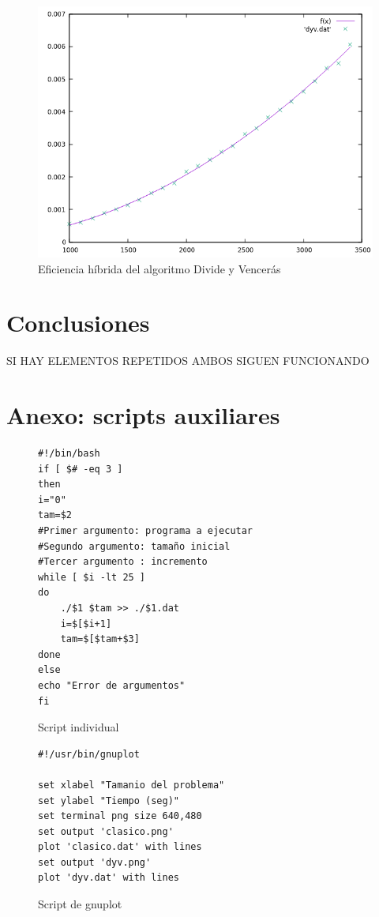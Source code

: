 \documentclass[12pt,spanish]{article}
\begin{document}
\begin{figure}[H]
\centering
\includegraphics[scale=0.75]{hibrida_dyv.png}
\caption{Eficiencia híbrida del algoritmo Divide y Vencerás}
\end{figure}

\newpage

\section{Conclusiones}

SI HAY ELEMENTOS REPETIDOS AMBOS SIGUEN FUNCIONANDO
\section{Anexo: scripts auxiliares}
\label{sec:scripts}

\begin{figure}[H]
\begin{verbatim}
#!/bin/bash
if [ $# -eq 3 ]
then
i="0"
tam=$2
#Primer argumento: programa a ejecutar
#Segundo argumento: tamaño inicial
#Tercer argumento : incremento
while [ $i -lt 25 ]
do
	./$1 $tam >> ./$1.dat
	i=$[$i+1]
	tam=$[$tam+$3]
done
else
echo "Error de argumentos"
fi

\end{verbatim}
\caption{Script individual}
\end{figure}



\begin{figure}[H]
\begin{verbatim}
#!/usr/bin/gnuplot

set xlabel "Tamanio del problema"
set ylabel "Tiempo (seg)"
set terminal png size 640,480
set output 'clasico.png'
plot 'clasico.dat' with lines
set output 'dyv.png'
plot 'dyv.dat' with lines
\end{verbatim}
\caption{Script de gnuplot}
\end{figure}
\end{document}
